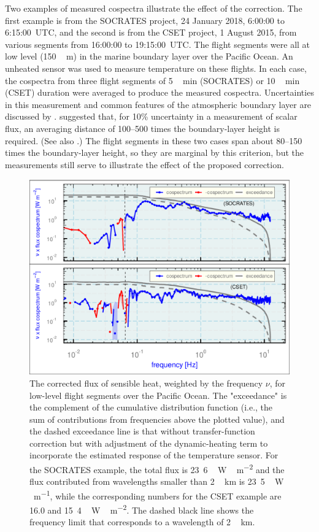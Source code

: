 \documentclass[amt, manuscript]{copernicus}
\begin{document}
Two examples of measured cospectra illustrate the effect of the
correction. The first example is from the SOCRATES project, 24 January
2018, 6:00:00 to 6:15:00~UTC, and the second is from the CSET project, 1
August 2015, from various segments from 16:00:00 to 19:15:00~UTC. The
flight segments were all at low level (\unit{150\,m}) in the marine
boundary layer over the Pacific Ocean. An unheated sensor was used to
measure temperature on these flights. In each case, the cospectra from
three flight segments of \unit{5\,min} (SOCRATES) or \unit{10\,min}
(CSET) duration were averaged to produce the measured cospectra.
Uncertainties in this measurement and common features of the atmospheric
boundary layer are discussed by \citet{lenschow95micro}.
\citet{lenschow1986length} suggested that, for 10\% uncertainty in a
measurement of scalar flux, an averaging distance of 100--500 times the
boundary-layer height is required. (See also \citet{lenschow1994long}.)
The flight segments in these two cases span about 80--150 times the
boundary-layer height, so they are marginal by this criterion, but the
measurements still serve to illustrate the effect of the proposed
correction.

\begin{figure}

\begin{center}\includegraphics[width=12cm]{figure/fig9} \end{center}

\caption{The corrected flux of sensible heat, weighted by the frequency $\nu$,
for low-level flight segments over the Pacific Ocean. The "exceedance"
is the complement of the cumulative distribution function (i.e., the
sum of contributions from frequencies above the plotted value), and
the dashed exceedance line is that without transfer-function
correction but with adjustment of the dynamic-heating term to incorporate
the estimated response of the temperature sensor. For the SOCRATES example,
the total flux is \unit{23.6\,W\,m^{-2}} and the flux contributed from wavelengths smaller than \unit{2\,km} is \unit{23.5\,W\,m^{-1}}, while the corresponding numbers for the CSET example are 16.0 and \unit{15.4\,W\,m^{-2}}. The dashed black
line shows the frequency limit that corresponds to a wavelength of
\unit{2\,km}.{\label{fig:SOCp1}}}
\end{figure}
\end{document}
